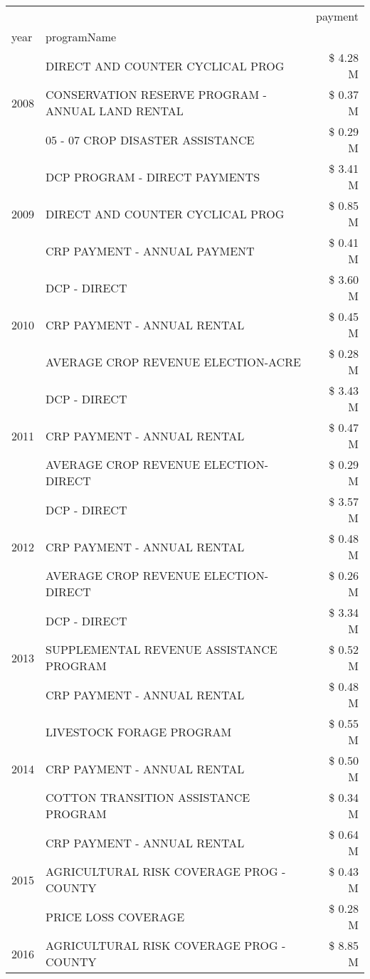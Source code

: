\begin{tabular}{llr}
\toprule
 &  & payment \\
year & programName &  \\
\midrule
\multirow[t]{3}{*}{2008} & DIRECT AND COUNTER CYCLICAL PROG & \$ 4.28 M \\
 & CONSERVATION RESERVE PROGRAM - ANNUAL LAND RENTAL & \$ 0.37 M \\
 & 05 - 07 CROP DISASTER ASSISTANCE & \$ 0.29 M \\
\cline{1-3}
\multirow[t]{3}{*}{2009} & DCP PROGRAM - DIRECT PAYMENTS & \$ 3.41 M \\
 & DIRECT AND COUNTER CYCLICAL PROG & \$ 0.85 M \\
 & CRP PAYMENT - ANNUAL PAYMENT & \$ 0.41 M \\
\cline{1-3}
\multirow[t]{3}{*}{2010} & DCP - DIRECT & \$ 3.60 M \\
 & CRP PAYMENT - ANNUAL RENTAL & \$ 0.45 M \\
 & AVERAGE CROP REVENUE ELECTION-ACRE & \$ 0.28 M \\
\cline{1-3}
\multirow[t]{3}{*}{2011} & DCP - DIRECT & \$ 3.43 M \\
 & CRP PAYMENT - ANNUAL RENTAL & \$ 0.47 M \\
 & AVERAGE CROP REVENUE ELECTION-DIRECT & \$ 0.29 M \\
\cline{1-3}
\multirow[t]{3}{*}{2012} & DCP - DIRECT & \$ 3.57 M \\
 & CRP PAYMENT - ANNUAL RENTAL & \$ 0.48 M \\
 & AVERAGE CROP REVENUE ELECTION-DIRECT & \$ 0.26 M \\
\cline{1-3}
\multirow[t]{3}{*}{2013} & DCP - DIRECT & \$ 3.34 M \\
 & SUPPLEMENTAL REVENUE ASSISTANCE PROGRAM & \$ 0.52 M \\
 & CRP PAYMENT - ANNUAL RENTAL & \$ 0.48 M \\
\cline{1-3}
\multirow[t]{3}{*}{2014} & LIVESTOCK FORAGE PROGRAM & \$ 0.55 M \\
 & CRP PAYMENT - ANNUAL RENTAL & \$ 0.50 M \\
 & COTTON TRANSITION ASSISTANCE PROGRAM & \$ 0.34 M \\
\cline{1-3}
\multirow[t]{3}{*}{2015} & CRP PAYMENT - ANNUAL RENTAL & \$ 0.64 M \\
 & AGRICULTURAL RISK COVERAGE PROG - COUNTY & \$ 0.43 M \\
 & PRICE LOSS COVERAGE & \$ 0.28 M \\
\cline{1-3}
\multirow[t]{3}{*}{2016} & AGRICULTURAL RISK COVERAGE PROG - COUNTY & \$ 8.85 M \\

\end{tabular}

